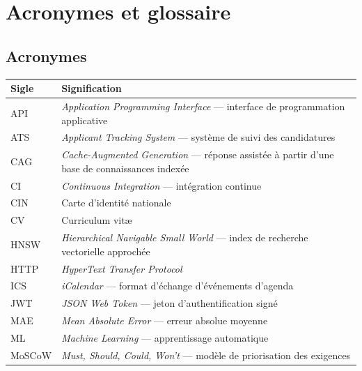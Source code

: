 %
\chapter*{Acronymes et glossaire}

\section*{Acronymes}

\noindent%
\begin{tabularx}{\textwidth}{L{2.4cm} X}
  \toprule
  \textbf{Sigle} & \textbf{Signification} \\
  \midrule
  API    & \emph{Application Programming Interface} — interface de programmation applicative \\
  ATS    & \emph{Applicant Tracking System} — système de suivi des candidatures \\
  CAG    & \emph{Cache-Augmented Generation} — réponse assistée à partir d'une base de connaissances indexée \\
  CI     & \emph{Continuous Integration} — intégration continue \\
  CIN    & Carte d'identité nationale \\
  CV     & Curriculum vitæ \\
  HNSW   & \emph{Hierarchical Navigable Small World} — index de recherche vectorielle approchée \\
  HTTP   & \emph{HyperText Transfer Protocol} \\
  ICS    & \emph{iCalendar} — format d'échange d'événements d'agenda \\
  JWT    & \emph{JSON Web Token} — jeton d'authentification signé \\
  MAE    & \emph{Mean Absolute Error} — erreur absolue moyenne \\
  ML     & \emph{Machine Learning} — apprentissage automatique \\
  MoSCoW & \emph{Must, Should, Could, Won't} — modèle de priorisation des exigences \\
  \bottomrule
\end{tabularx}


